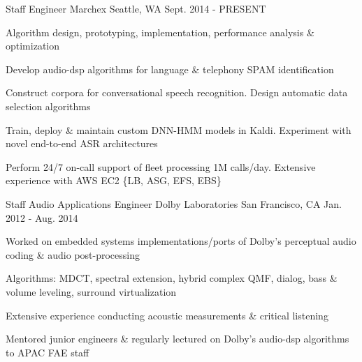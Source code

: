 

\begin{cventries}

  \cventry
    {Staff Engineer} %
    {Marchex} %
    {Seattle, WA} %
    {Sept. 2014 - PRESENT} %
    {
      \begin{cvitems} %
        \item {Algorithm design, prototyping, implementation, performance analysis \& optimization}
        \item {Develop audio-dsp algorithms for language \& telephony SPAM identification}
        \item {Construct corpora for conversational speech recognition. Design automatic data selection algorithms}
        \item {Train, deploy \& maintain custom DNN-HMM models in Kaldi. Experiment with novel end-to-end ASR architectures}
        \item {Perform 24/7 on-call support of fleet processing 1M calls/day. Extensive experience with AWS EC2 \{LB, ASG, EFS, EBS\}}
      \end{cvitems}
    }

  \cventry
    {Staff Audio Applications Engineer} %
    {Dolby Laboratories} %
    {San Francisco, CA} %
    {Jan. 2012 - Aug. 2014} %
    {
      \begin{cvitems} %
        \item {Worked on embedded systems implementations/ports of Dolby's perceptual audio coding \& audio post-processing}
        \item {Algorithms: MDCT, spectral extension, hybrid complex QMF, dialog, bass \& volume leveling, surround virtualization}
		\item {Extensive experience conducting acoustic measurements \& critical listening}
        \item {Mentored junior engineers \& regularly lectured on Dolby's audio-dsp algorithms to APAC FAE staff}
      \end{cvitems}
    }


\end{cventries}
